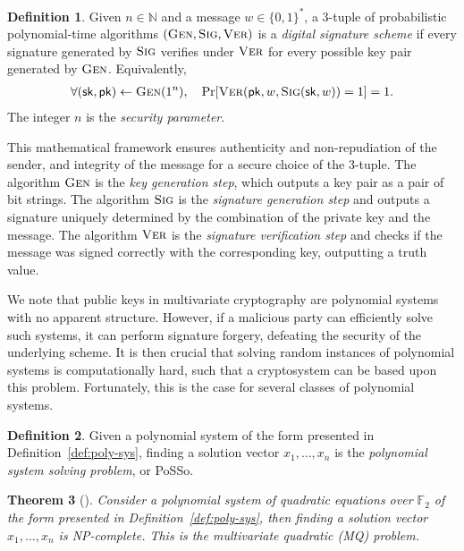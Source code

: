 \documentclass[12pt, a4paper, oneside]{memoir}
\newtheorem{theorem}{Theorem}[section]
\theoremstyle{definition}
\newtheorem{definition}[theorem]{Definition}
\begin{document}
\begin{definition}
  Given $n \in \mathbb{N}$ and a message $w \in \{0, 1\}^{*}$, a $3$-tuple of probabilistic polynomial-time algorithms $(\textsc{Gen}, \textsc{Sig}, \textsc{Ver})$ is a \emph{digital signature scheme} if every signature generated by $\textsc{Sig}$ verifies under $\textsc{Ver}$ for every possible key pair generated by $\textsc{Gen}$. Equivalently,
  \begin{align}
     \forall (\mathsf{sk}, \mathsf{pk}) \leftarrow \textsc{Gen}(1^{n}),
       \quad \Pr[\textsc{Ver}(\mathsf{pk}, w, \textsc{Sig}(\mathsf{sk}, w)) = 1] = 1.
  \end{align}
  The integer $n$ is the \emph{security parameter}.
\end{definition}

This mathematical framework ensures authenticity and non-repudiation of the sender, and integrity of the message for a secure choice of the $3$-tuple. The algorithm $\textsc{Gen}$ is the \emph{key generation step}, which outputs a key pair as a pair of bit strings. The algorithm $\textsc{Sig}$ is the \emph{signature generation step} and outputs a signature uniquely determined by the combination of the private key and the message. The algorithm $\textsc{Ver}$ is the \emph{signature verification step} and checks if the message was signed correctly with the corresponding key, outputting a truth value.

We note that public keys in multivariate cryptography are polynomial systems with no apparent structure. However, if a malicious party can efficiently solve such systems, it can perform signature forgery, defeating the security of the underlying scheme. It is then crucial that solving random instances of polynomial systems is computationally hard, such that a cryptosystem can be based upon this problem. Fortunately, this is the case for several classes of polynomial systems.

\begin{definition}\label{def:posso}
  Given a polynomial system of the form presented in Definition~\ref{def:poly-sys}, finding a solution vector $x_{1}, \dots, x_{n}$ is the \emph{polynomial system solving problem}, or \textsf{PoSSo}.
\end{definition}

\begin{theorem}[{\cite[App.~A]{Patarin:199711}}]
  Consider a polynomial system of \emph{quadratic equations over $\mathbb{F}_{2}$} of the form presented in Definition~\ref{def:poly-sys}, then finding a solution vector $x_{1}, \dots, x_{n}$ is NP-complete. This is the \emph{multivariate quadratic (MQ) problem}.
\end{theorem}
\end{document}
